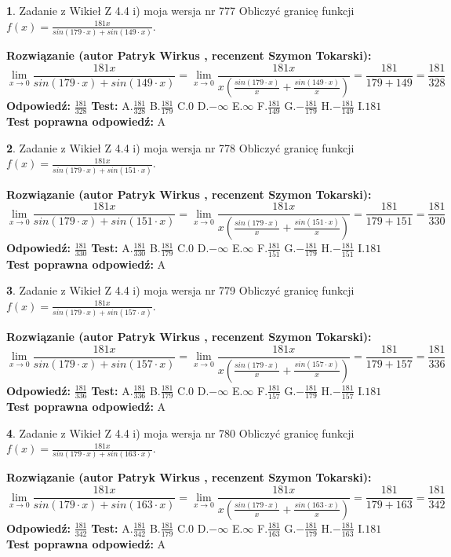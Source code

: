 \documentclass[12pt, a4paper]{article}
\theoremstyle{definition} %
\newtheorem{zad}{}
\newcommand{\zadStart}[1]{\begin{zad}#1\newline}
\newcommand{\zadStop}{\end{zad}}
\newcommand{\rozwStart}[2]{\noindent \textbf{Rozwiązanie (autor #1 , recenzent #2): }\newline}
\newcommand{\rozwStop}{\newline}
\newcommand{\odpStart}{\noindent \textbf{Odpowiedź:}\newline}
\newcommand{\odpStop}{\newline}
\newcommand{\testStart}{\noindent \textbf{Test:}\newline}
\newcommand{\testStop}{\newline}
\newcommand{\kluczStart}{\noindent \textbf{Test poprawna odpowiedź:}\newline}
\newcommand{\kluczStop}{\newline}
\begin{document}
\zadStart{Zadanie z Wikieł Z 4.4 i) moja wersja nr 777}
Obliczyć granicę funkcji $f(x)=\frac{181x}{sin(179\cdot x) +sin(149\cdot x)}$.
\zadStop
\rozwStart{Patryk Wirkus}{Szymon Tokarski}
$$\lim\limits_{x\to 0}\frac{181x}{sin(179\cdot x) +sin(149\cdot x)}=\lim\limits_{x\to 0}\frac{181x}{x(\frac{sin(179\cdot x)}{x}+\frac{sin(149\cdot x)}{x})}=\frac{181}{179+149} = \frac{181}{328}$$
\rozwStop
\odpStart
$\frac{181}{328}$
\odpStop
\testStart
A.$\frac{181}{328}$
B.$\frac{181}{179}$
C.$0$
D.$-\infty$
E.$\infty$
F.$\frac{181}{149}$
G.$-\frac{181}{179}$
H.$-\frac{181}{149}$
I.$181$
\testStop
\kluczStart
A
\kluczStop



\zadStart{Zadanie z Wikieł Z 4.4 i) moja wersja nr 778}
Obliczyć granicę funkcji $f(x)=\frac{181x}{sin(179\cdot x) +sin(151\cdot x)}$.
\zadStop
\rozwStart{Patryk Wirkus}{Szymon Tokarski}
$$\lim\limits_{x\to 0}\frac{181x}{sin(179\cdot x) +sin(151\cdot x)}=\lim\limits_{x\to 0}\frac{181x}{x(\frac{sin(179\cdot x)}{x}+\frac{sin(151\cdot x)}{x})}=\frac{181}{179+151} = \frac{181}{330}$$
\rozwStop
\odpStart
$\frac{181}{330}$
\odpStop
\testStart
A.$\frac{181}{330}$
B.$\frac{181}{179}$
C.$0$
D.$-\infty$
E.$\infty$
F.$\frac{181}{151}$
G.$-\frac{181}{179}$
H.$-\frac{181}{151}$
I.$181$
\testStop
\kluczStart
A
\kluczStop



\zadStart{Zadanie z Wikieł Z 4.4 i) moja wersja nr 779}
Obliczyć granicę funkcji $f(x)=\frac{181x}{sin(179\cdot x) +sin(157\cdot x)}$.
\zadStop
\rozwStart{Patryk Wirkus}{Szymon Tokarski}
$$\lim\limits_{x\to 0}\frac{181x}{sin(179\cdot x) +sin(157\cdot x)}=\lim\limits_{x\to 0}\frac{181x}{x(\frac{sin(179\cdot x)}{x}+\frac{sin(157\cdot x)}{x})}=\frac{181}{179+157} = \frac{181}{336}$$
\rozwStop
\odpStart
$\frac{181}{336}$
\odpStop
\testStart
A.$\frac{181}{336}$
B.$\frac{181}{179}$
C.$0$
D.$-\infty$
E.$\infty$
F.$\frac{181}{157}$
G.$-\frac{181}{179}$
H.$-\frac{181}{157}$
I.$181$
\testStop
\kluczStart
A
\kluczStop



\zadStart{Zadanie z Wikieł Z 4.4 i) moja wersja nr 780}
Obliczyć granicę funkcji $f(x)=\frac{181x}{sin(179\cdot x) +sin(163\cdot x)}$.
\zadStop
\rozwStart{Patryk Wirkus}{Szymon Tokarski}
$$\lim\limits_{x\to 0}\frac{181x}{sin(179\cdot x) +sin(163\cdot x)}=\lim\limits_{x\to 0}\frac{181x}{x(\frac{sin(179\cdot x)}{x}+\frac{sin(163\cdot x)}{x})}=\frac{181}{179+163} = \frac{181}{342}$$
\rozwStop
\odpStart
$\frac{181}{342}$
\odpStop
\testStart
A.$\frac{181}{342}$
B.$\frac{181}{179}$
C.$0$
D.$-\infty$
E.$\infty$
F.$\frac{181}{163}$
G.$-\frac{181}{179}$
H.$-\frac{181}{163}$
I.$181$
\testStop
\kluczStart
A
\kluczStop
\end{document}
